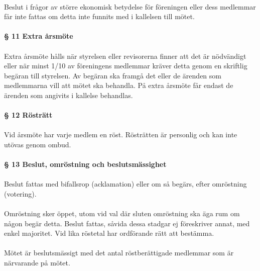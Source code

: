 \documentclass[12pt, a4paper]{article}
\begin{document}
\paragraph{}
Beslut i frågor av större ekonomisk betydelse för föreningen eller dess medlemmar får inte fattas om detta inte funnits med i kallelsen till mötet.

\paragraph{§ 11 Extra årsmöte}
\paragraph{}
Extra årsmöte hålls när styrelsen eller revisorerna finner att det är nödvändigt eller när minst 1/10 av föreningens medlemmar kräver detta genom en
skriftlig begäran till styrelsen. Av begäran ska framgå det eller de ärenden som medlemmarna vill att mötet ska behandla. På extra årsmöte får
endast de ärenden som angivits i kallelse behandlas.

\paragraph{§ 12 Rösträtt}
\paragraph{}
Vid årsmöte har varje medlem en röst. Rösträtten är personlig och kan inte utövas genom ombud.

\paragraph{§ 13 Beslut, omröstning och beslutsmässighet}
\paragraph{}
Beslut fattas med bifallsrop (acklamation) eller om så begärs, efter omröstning (votering).

\paragraph{}
Omröstning sker öppet, utom vid val där sluten omröstning ska äga rum om någon begär detta. Beslut fattas, såvida dessa stadgar ej föreskriver
annat, med enkel majoritet. Vid lika röstetal har ordförande rätt att bestämma.

\paragraph{}
Mötet är beslutsmässigt med det antal röstberättigade medlemmar som är närvarande på mötet.
\end{document}
